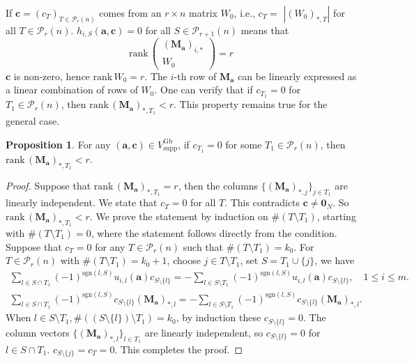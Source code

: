 \documentclass[a4paper, 11pt]{amsart}
\newcommand{\mc}[1]{\mathcal{#1}}
\newcommand{\ssm}[1]{\sum_{#1}}
\newcommand{\td}[1]{\bm{#1}}
\newcommand{\tx}[1]{\text{#1}}
\theoremstyle{definition}
\newtheorem{proposition}[theorem]{Proposition}
\theoremstyle{definition}
\begin{document}
	
	If $\td{c}=(c_T)_{T\in\mc{P}_r(n)}$ comes from an $r\times n$ matrix $W_0$, i.e., $c_T=$ $|(W_0)_{*,T}|$ for all $T\in\mc{P}_r(n)$. $h_{i,S}(\td{a},\td{c})=0$ for all $S\in\mc{P}_{r+1}(n)$ means that
	\begin{equation*}
		\tx{rank}\,\begin{pmatrix}
			(\td{M_a})_{i,*}\\
			W_0
		\end{pmatrix}=r
	\end{equation*}
	$\td{c}$ is non-zero, hence $\tx{rank}\,W_0=r$. The $i$-th row of $\td{M_a}$ can be linearly expressed as a linear combination of rows of $W_0$. One can verify that if $c_{T_1}=0$ for $T_1\in\mc{P}_r(n)$, then $\tx{rank}\,(\td{M_a})_{*,T_1}<r$. This property remains true for the general case.
	
	\begin{proposition}
		For any $(\td{a},\td{c})\in V^{\tx{Gb}}_{\tx{supp}}$, if $c_{T_1}=0$ for some $T_1\in\mc{P}_r(n)$, then $\tx{rank}\,(\td{M_a})_{*,T_1}<r$.
	\end{proposition}
	
	
	\begin{proof}
		Suppose that $\tx{rank}\,(\td{M_a})_{*,T_1}=r$, then the columns $\{(\td{M_a})_{*,j}\}_{j\in T_1}$ are linearly independent. We state that $c_T=0$ for all $T$. This contradicts $\td{c}\neq\td{0}_N$. So $\tx{rank}\,(\td{M_a})_{*,T_1}<r$. We prove the statement by induction on $\#(T\setminus T_1)$, starting with $\#(T\setminus T_1)=0$, where the statement follows directly from the condition. Suppose that $c_T=0$ for any $T\in\mc{P}_r(n)$ such that $\#(T\setminus T_1)=k_0$. For $T\in\mc{P}_r(n)$ with $\#(T\setminus T_1)=k_0+1$, choose $j\in T\setminus T_1$, set $S=T_1\cup\{j\}$, we have
		\begin{gather*}
			\ssm{l\in S\cap T_1}(-1)^{\tx{sgn}(l,S)}u_{i,l}(\td{a})c_{S\setminus\{l\}}=-\ssm{l\in S\setminus T_1}(-1)^{\tx{sgn}(l,S)}u_{i,l}(\td{a})c_{S\setminus\{l\}},\quad  1\leq i\leq m.\\
			\ssm{l\in S\cap T_1}(-1)^{\tx{sgn}(l,S)}c_{S\setminus\{l\}}(\td{M_a})_{*,l}=-\ssm{l\in S\setminus T_1}(-1)^{\tx{sgn}(l,S)}c_{S\setminus\{l\}}(\td{M_a})_{*,l}.
		\end{gather*}
		When $l\in S\setminus T_1,\#((S\setminus\{l\})\setminus T_1)=k_0$, by induction these $c_{S\setminus\{l\}}=0$. The column vectors $\{(\td{M_a})_{*,l}\}_{l\in T_1}$ are linearly independent, so $c_{S\setminus\{l\}}=0$ for $l\in S\cap T_1$. $c_{S\setminus\{j\}}=c_T=0$. This completes the proof.
	\end{proof}
	
\end{document}
